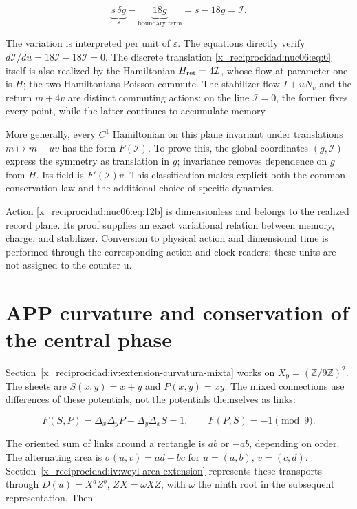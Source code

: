 \begin{equation}
\underbrace{s\,\delta g}_{s}
-\underbrace{18g}_{\text{boundary term}}
=s-18g=\mathcal I.
\label{x_reciprocidad:nuc06:eq:12c}
\end{equation}

The variation is interpreted per unit of \(\varepsilon\). The equations directly verify \(d\mathcal I/du=18\mathcal I-18\mathcal I=0\). The discrete translation \eqref{x_reciprocidad:nuc06:eq:6} itself is also realized by the Hamiltonian \(H_{\rm ret}=4\mathcal I\), whose flow at parameter one is \(H\); the two Hamiltonians Poisson-commute. The stabilizer flow \(I+uN_v\) and the return \(m+4v\) are distinct commuting actions: on the line \(\mathcal I=0\), the former fixes every point, while the latter continues to accumulate memory.

More generally, every \(C^1\) Hamiltonian on this plane invariant under translations \(m\mapsto m+uv\) has the form \(F(\mathcal I)\). To prove this, the global coordinates \((g,\mathcal I)\) express the symmetry as translation in \(g\); invariance removes dependence on \(g\) from \(H\). Its field is \(F'(\mathcal I)v\). This classification makes explicit both the common conservation law and the additional choice of specific dynamics.

Action \eqref{x_reciprocidad:nuc06:eq:12b} is dimensionless and belongs to the realized record plane. Its proof supplies an exact variational relation between memory, charge, and stabilizer. Conversion to physical action and dimensional time is performed through the corresponding action and clock readers; these units are not assigned to the counter u.

\section{APP curvature and conservation of the central phase}

Section~\ref{x_reciprocidad:iv:extension-curvatura-mixta} works on \(X_9=(\mathbb Z/9\mathbb Z)^2\). The sheets are \(S(x,y)=x+y\) and \(P(x,y)=xy\). The mixed connections use differences of these potentials, not the potentials themselves as links:

\begin{equation}
F(S,P)=\Delta_x\Delta_yP-\Delta_y\Delta_xS=1,
\qquad F(P,S)=-1\pmod9.
\label{x_reciprocidad:nuc06:eq:13}
\end{equation}

The oriented sum of links around a rectangle is \(ab\) or \(-ab\), depending on order. The alternating area is \(\sigma(u,v)=ad-bc\) for \(u=(a,b)\), \(v=(c,d)\). Section~\ref{x_reciprocidad:iv:weyl-area-extension} represents these transports through \(D(u)=X^aZ^b\), \(ZX=\omega XZ\), with \(\omega\) the ninth root in the subsequent representation. Then

